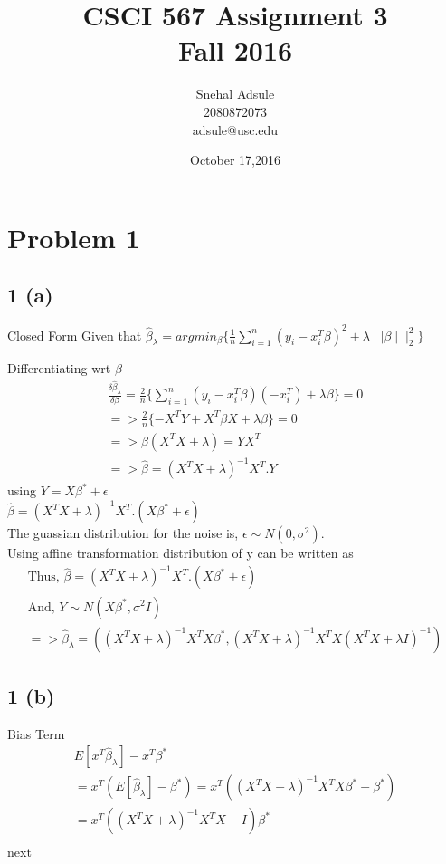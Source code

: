 \documentclass[10pt,letterpaper]{article}
\begin{document}
\title{CSCI 567 Assignment 3 \\Fall 2016}
\date{ October 17,2016}
\author{Snehal Adsule\\2080872073\\adsule@usc.edu}
\maketitle
\section{Problem 1}
\subsection{1 (a)} Closed Form 
Given that $\hat \beta_{\lambda } =arg min_{\beta} \big\{  \frac{1}{n} \sum_{i=1}^n (y_i - x_i^T \beta) ^2 +\lambda \mid \mid \beta\mid \mid_2^2 \big \}$

Differentiating wrt $\beta$
	\begin{align*}
	\frac{\delta\hat\beta_{\lambda}}{\delta \beta} =  \frac{2}{n} \{\sum_{i=1}^n(y_i - x_i^T \beta)(-x_i^T) + \lambda \beta \} =0 \\
	=>\frac{2}{n} \{ -X^TY+ X^T\beta X+ \lambda \beta \} = 0\\
	=> \beta(X^TX + \lambda)= YX^T\\
	=>\hat \beta =(X^TX + \lambda)^{-1}X^T .Y
	\end{align*}
using $Y=X\beta^* + \epsilon $\\
$\hat \beta =(X^TX + \lambda)^{-1}X^T . (X\beta^* + \epsilon )$\\
The guassian distribution for the noise is, $\epsilon ∼ N(0, \sigma^2)$.\\
Using affine transformation distribution of y can be written as\\

	\begin{align*}
	\text{Thus,  }  \hat \beta =(X^TX + \lambda)^{-1}X^T . (X\beta^* + \epsilon )\\
	\text{And,  }Y ∼ N(X\beta^*, \sigma^2 I)\\
	=>\hat \beta_\lambda = ((X^TX + \lambda)^{-1} X^TX\beta ^* , (X^TX + \lambda)^{-1} X^TX (X^TX + \lambda I)^{-1})
	\end{align*}


\subsection{1 (b)} Bias Term
	\begin{align*}
	E[x^T\hat\beta_\lambda] - x^T \beta^* \\
	= x^T (E[\hat\beta_ \lambda] - \beta^* ) = x^T((  X^T X + λ)^{-1} X^T X\beta^* − \beta^*)   \\
	= x^T ((  X^T X + \lambda)^{-1} X^T X - I  )\beta^* \\
	\end{align*}
next
\end{document}
